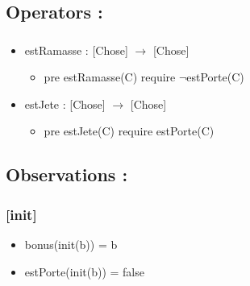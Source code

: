 \documentclass[11pt]{article}
\begin{document}
\subsection{Operators :}
\label{sec-1.5}

\subsubsection{}

\begin{itemize}

\item estRamasse : [Chose] $\to$ [Chose]\\
\label{sec-1.5.1.1}

\begin{itemize}

\item pre estRamasse(C) require $\neg$estPorte(C)\\
\label{sec-1.5.1.1.1}


\end{itemize} %

\item estJete : [Chose] $\to$ [Chose]\\
\label{sec-1.5.1.2}

\begin{itemize}

\item pre estJete(C) require estPorte(C)\\
\label{sec-1.5.1.2.1}


\end{itemize} %
\end{itemize} %
\subsection{Observations :}
\label{sec-1.6}

\subsubsection{[init]}
\label{sec-1.6.1}

\begin{itemize}

\item bonus(init(b)) = b\\
\label{sec-1.6.1.1}


\item estPorte(init(b)) = false\\
\label{sec-1.6.1.2}


\end{itemize} %
\end{document}
